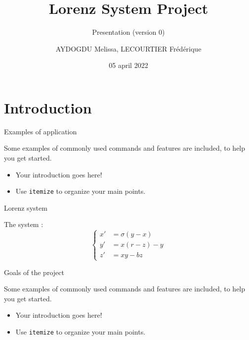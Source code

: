 \documentclass[10pt,xcolor={table,dvipsnames},t]{beamer}
\title[Your Short Title]{Lorenz System Project}
\subtitle{Presentation (version 0)}
\author[name]{AYDOGDU Melissa, LECOURTIER Frédérique}
\institute{\large Strasbourg University}
\date{05 april 2022}
\begin{document}
\begin{frame}
  \titlepage
\end{frame}




\section{Introduction}


\begin{frame}{Examples of application}
    
    Some examples of commonly used commands and features are included, to help you get started.
    \begin{itemize}
      \item Your introduction goes here!
      \item Use \texttt{itemize} to organize your main points.
    \end{itemize}

\end{frame}

\begin{frame}{Lorenz system}
    
    The system :
    $$\left\{\begin{aligned} 
    x'&=\sigma(y-x) \\
    y'&=x(r-z)-y \\
    z'&=xy-bz
    \end{aligned}\right.$$

\end{frame}


\begin{frame}{Goals of the project}
    
    Some examples of commonly used commands and features are included, to help you get started.
    \begin{itemize}
      \item Your introduction goes here!
      \item Use \texttt{itemize} to organize your main points.
    \end{itemize}

\end{frame}
\end{document}
